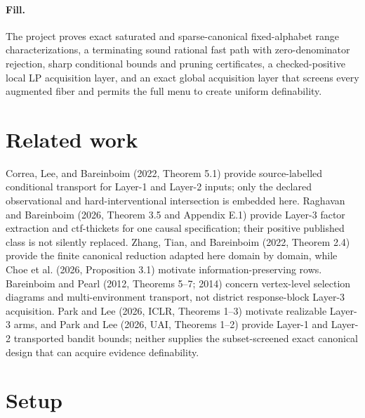 \documentclass{article}
\begin{document}
\paragraph{Fill.} The project proves exact saturated and sparse-canonical fixed-alphabet range characterizations, a terminating sound rational fast path with zero-denominator rejection, sharp conditional bounds and pruning certificates, a checked-positive local LP acquisition layer, and an exact global acquisition layer that screens every augmented fiber and permits the full menu to create uniform definability.

\section{Related work}

Correa, Lee, and Bareinboim (2022, Theorem 5.1) provide source-labelled conditional transport for Layer-1 and Layer-2 inputs; only the declared observational and hard-interventional intersection is embedded here.  Raghavan and Bareinboim (2026, Theorem 3.5 and Appendix E.1) provide Layer-3 factor extraction and ctf-thickets for one causal specification; their positive published class is not silently replaced.  Zhang, Tian, and Bareinboim (2022, Theorem 2.4) provide the finite canonical reduction adapted here domain by domain, while Choe et al. (2026, Proposition 3.1) motivate information-preserving rows.  Bareinboim and Pearl (2012, Theorems 5--7; 2014) concern vertex-level selection diagrams and multi-environment transport, not district response-block Layer-3 acquisition.  Park and Lee (2026, ICLR, Theorems 1--3) motivate realizable Layer-3 arms, and Park and Lee (2026, UAI, Theorems 1--2) provide Layer-1 and Layer-2 transported bandit bounds; neither supplies the subset-screened exact canonical design that can acquire evidence definability.

\section{Setup}
\end{document}
